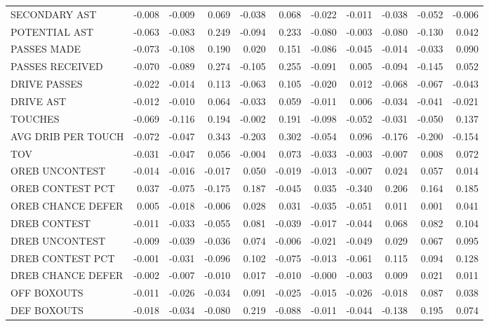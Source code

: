 \begin{tabular}{lrrrrrrrrrr}
SECONDARY AST & -0.008 & -0.009 & 0.069 & -0.038 & 0.068 & -0.022 & -0.011 & -0.038 & -0.052 & -0.006 \\
POTENTIAL AST & -0.063 & -0.083 & 0.249 & -0.094 & 0.233 & -0.080 & -0.003 & -0.080 & -0.130 & 0.042 \\
PASSES MADE & -0.073 & -0.108 & 0.190 & 0.020 & 0.151 & -0.086 & -0.045 & -0.014 & -0.033 & 0.090 \\
PASSES RECEIVED & -0.070 & -0.089 & 0.274 & -0.105 & 0.255 & -0.091 & 0.005 & -0.094 & -0.145 & 0.052 \\
DRIVE PASSES & -0.022 & -0.014 & 0.113 & -0.063 & 0.105 & -0.020 & 0.012 & -0.068 & -0.067 & -0.043 \\
DRIVE AST & -0.012 & -0.010 & 0.064 & -0.033 & 0.059 & -0.011 & 0.006 & -0.034 & -0.041 & -0.021 \\
TOUCHES & -0.069 & -0.116 & 0.194 & -0.002 & 0.191 & -0.098 & -0.052 & -0.031 & -0.050 & 0.137 \\
AVG DRIB PER TOUCH & -0.072 & -0.047 & 0.343 & -0.203 & 0.302 & -0.054 & 0.096 & -0.176 & -0.200 & -0.154 \\
TOV & -0.031 & -0.047 & 0.056 & -0.004 & 0.073 & -0.033 & -0.003 & -0.007 & 0.008 & 0.072 \\
OREB UNCONTEST & -0.014 & -0.016 & -0.017 & 0.050 & -0.019 & -0.013 & -0.007 & 0.024 & 0.057 & 0.014 \\
OREB CONTEST PCT & 0.037 & -0.075 & -0.175 & 0.187 & -0.045 & 0.035 & -0.340 & 0.206 & 0.164 & 0.185 \\
OREB CHANCE DEFER & 0.005 & -0.018 & -0.006 & 0.028 & 0.031 & -0.035 & -0.051 & 0.011 & 0.001 & 0.041 \\
DREB CONTEST & -0.011 & -0.033 & -0.055 & 0.081 & -0.039 & -0.017 & -0.044 & 0.068 & 0.082 & 0.104 \\
DREB UNCONTEST & -0.009 & -0.039 & -0.036 & 0.074 & -0.006 & -0.021 & -0.049 & 0.029 & 0.067 & 0.095 \\
DREB CONTEST PCT & -0.001 & -0.031 & -0.096 & 0.102 & -0.075 & -0.013 & -0.061 & 0.115 & 0.094 & 0.128 \\
DREB CHANCE DEFER & -0.002 & -0.007 & -0.010 & 0.017 & -0.010 & -0.000 & -0.003 & 0.009 & 0.021 & 0.011 \\
OFF BOXOUTS & -0.011 & -0.026 & -0.034 & 0.091 & -0.025 & -0.015 & -0.026 & -0.018 & 0.087 & 0.038 \\
DEF BOXOUTS & -0.018 & -0.034 & -0.080 & 0.219 & -0.088 & -0.011 & -0.044 & -0.138 & 0.195 & 0.074 \\
\bottomrule
\end{tabular}
